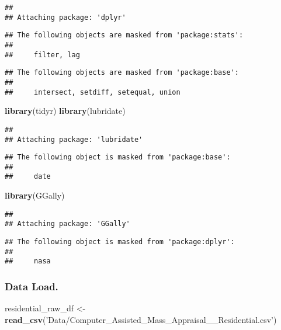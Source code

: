 \documentclass[]{article}
\newenvironment{Shaded}{\begin{snugshade}}{\end{snugshade}}
\newcommand{\KeywordTok}[1]{\textcolor[rgb]{0.13,0.29,0.53}{\textbf{#1}}}
\newcommand{\NormalTok}[1]{#1}
\newcommand{\StringTok}[1]{\textcolor[rgb]{0.31,0.60,0.02}{#1}}
\begin{document}
\begin{verbatim}
## 
## Attaching package: 'dplyr'
\end{verbatim}

\begin{verbatim}
## The following objects are masked from 'package:stats':
## 
##     filter, lag
\end{verbatim}

\begin{verbatim}
## The following objects are masked from 'package:base':
## 
##     intersect, setdiff, setequal, union
\end{verbatim}

\begin{Shaded}
\begin{Highlighting}[]
\KeywordTok{library}\NormalTok{(tidyr)}
\KeywordTok{library}\NormalTok{(lubridate)}
\end{Highlighting}
\end{Shaded}

\begin{verbatim}
## 
## Attaching package: 'lubridate'
\end{verbatim}

\begin{verbatim}
## The following object is masked from 'package:base':
## 
##     date
\end{verbatim}

\begin{Shaded}
\begin{Highlighting}[]
\KeywordTok{library}\NormalTok{(GGally)}
\end{Highlighting}
\end{Shaded}

\begin{verbatim}
## 
## Attaching package: 'GGally'
\end{verbatim}

\begin{verbatim}
## The following object is masked from 'package:dplyr':
## 
##     nasa
\end{verbatim}

\hypertarget{data-load.}{%
\subsubsection{Data Load.}\label{data-load.}}

\begin{Shaded}
\begin{Highlighting}[]
\NormalTok{residential_raw_df <-}\StringTok{ }\KeywordTok{read_csv}\NormalTok{(}\StringTok{'Data/Computer_Assisted_Mass_Appraisal__Residential.csv'}\NormalTok{)}
\end{Highlighting}
\end{Shaded}
\end{document}
